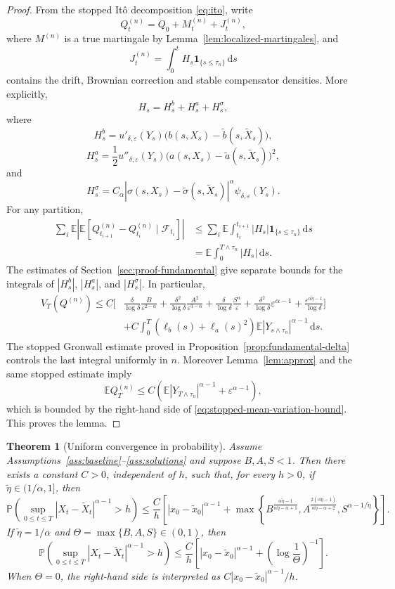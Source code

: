 \documentclass[10pt,a4paper]{amsart}
\newtheorem{theorem}{Theorem}[section]
\newcommand{\E}{\mathbb{E}}
\newcommand{\Pbb}{\mathbb{P}}
\newcommand{\F}{\mathcal{F}}
\newcommand{\1}{\mathbf{1}}
\newcommand{\dd}{\,\mathrm{d}}
\newcommand{\wt}{\tilde}
\newcommand{\eps}{\varepsilon}
\begin{document}
\begin{proof}
From the stopped It\^o decomposition \eqref{eq:ito}, write
\[
  Q_t^{(n)}=Q_0+M_t^{(n)}+J_t^{(n)},
\]
where $M^{(n)}$ is a true martingale by Lemma~\ref{lem:localized-martingales}, and
\[
  J_t^{(n)}=\int_0^t H_s\1_{\{s\le\tau_n\}}\dd s
\]
contains the drift, Brownian correction and stable compensator densities. More explicitly,
\[
H_s=H_s^b+H_s^a+H_s^\sigma,
\]
where
\[
H_s^b=u'_{\delta,\eps}(Y_s)\bigl(b(s,X_s)-\wt b(s,\wt X_s)\bigr),
\]
\[
H_s^a=\frac12 u''_{\delta,\eps}(Y_s)\bigl(a(s,X_s)-\wt a(s,\wt X_s)\bigr)^2,
\]
and
\[
H_s^\sigma=C_\alpha|\sigma(s,X_s)-\wt\sigma(s,\wt X_s)|^\alpha
\psi_{\delta,\eps}(Y_s).
\]
For any partition,
\begin{align*}
\sum_i\E\left|\E\left[Q_{t_{i+1}}^{(n)}-Q_{t_i}^{(n)}\mid\F_{t_i}\right]\right|
&\le \sum_i\E\int_{t_i}^{t_{i+1}}|H_s|\1_{\{s\le\tau_n\}}\dd s\\
&=\E\int_0^{T\wedge\tau_n}|H_s|\dd s.
\end{align*}
The estimates of Section~\ref{sec:proof-fundamental} give separate bounds for the integrals of $|H_s^b|$, $|H_s^a|$, and $|H_s^\sigma|$. In particular,
\begin{align*}
V_T(Q^{(n)})
\le C\Bigg[&
\frac{\delta}{\log\delta}\frac{B}{\eps^{2-\alpha}}
+\frac{\delta^2}{\log\delta}\frac{A^2}{\eps^{3-\alpha}}
+\frac{\delta}{\log\delta}\frac{S^\alpha}{\eps}
+\frac{\delta^2}{\log\delta}\eps^{\alpha-1}
+\frac{\eps^{\alpha\wt\eta-1}}{\log\delta}
\Bigg]\\
&+C\int_0^T(\ell_b(s)+\ell_a(s)^2)\E|Y_{s\wedge\tau_n}|^{\alpha-1}\dd s.
\end{align*}
The stopped Gronwall estimate proved in Proposition~\ref{prop:fundamental-delta} controls the last integral uniformly in $n$. Moreover Lemma~\ref{lem:approx} and the same stopped estimate imply
\[
  \E Q_T^{(n)}\le C\left(\E|Y_{T\wedge\tau_n}|^{\alpha-1}+\eps^{\alpha-1}\right),
\]
which is bounded by the right-hand side of \eqref{eq:stopped-mean-variation-bound}. This proves the lemma.
\end{proof}


\begin{theorem}[Uniform convergence in probability]\label{thm:probability}
Assume Assumptions~\ref{ass:baseline}--\ref{ass:solutions} and suppose $B,A,S<1$. Then there exists a constant $C>0$, independent of $h$, such that, for every $h>0$, if $\wt\eta\in(1/\alpha,1]$, then
\[
\Pbb\left(\sup_{0\le t\le T}|X_t-\wt X_t|^{\alpha-1}>h\right)
\le \frac{C}{h}\left[|x_0-\wt x_0|^{\alpha-1}
+\max\left\{
B^{\frac{\alpha\wt\eta-1}{\alpha\wt\eta-\alpha+1}},
A^{\frac{2(\alpha\wt\eta-1)}{\alpha\wt\eta-\alpha+2}},
S^{\alpha-1/\wt\eta}
\right\}\right].
\]
If $\wt\eta=1/\alpha$ and $\Theta=\max\{B,A,S\}\in(0,1)$, then
\[
\Pbb\left(\sup_{0\le t\le T}|X_t-\wt X_t|^{\alpha-1}>h\right)
\le \frac{C}{h}\left[|x_0-\wt x_0|^{\alpha-1}
+\left(\log\frac1\Theta\right)^{-1}\right].
\]
When $\Theta=0$, the right-hand side is interpreted as $C|x_0-\wt x_0|^{\alpha-1}/h$.
\end{theorem}
\end{document}
